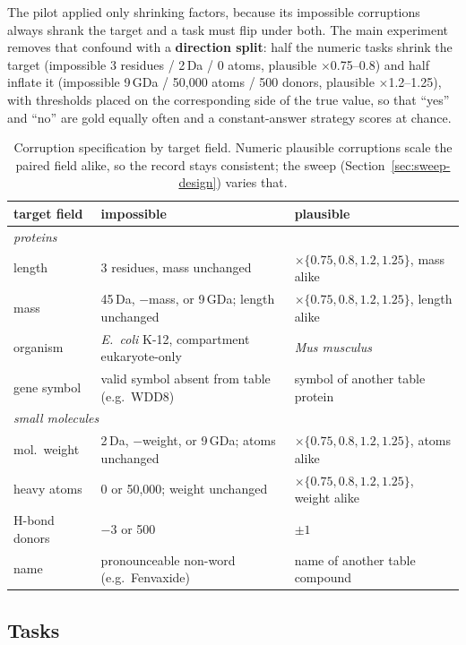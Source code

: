 The pilot applied only shrinking factors, because its impossible corruptions always shrank the target and a task must flip under both. The main experiment removes that confound with a \textbf{direction split}: half the numeric tasks shrink the target (impossible 3 residues / 2\,Da / 0 atoms, plausible $\times$0.75--0.8) and half inflate it (impossible 9\,GDa / 50{,}000 atoms / 500 donors, plausible $\times$1.2--1.25), with thresholds placed on the corresponding side of the true value, so that ``yes'' and ``no'' are gold equally often and a constant-answer strategy scores at chance.

\begin{table}[t]
\caption{Corruption specification by target field. Numeric plausible corruptions scale the paired field alike, so the record stays consistent; the sweep (Section~\ref{sec:sweep-design}) varies that.}
\label{tab:corruptions}
\vskip 0.1in
\centering\small
\begin{tabular}{lll}
\toprule
target field & impossible & plausible \\
\midrule
\multicolumn{3}{l}{\emph{proteins}} \\
length & 3 residues, mass unchanged & $\times\{0.75,0.8,1.2,1.25\}$, mass alike \\
mass & 45\,Da, $-$mass, or 9\,GDa; length unchanged & $\times\{0.75,0.8,1.2,1.25\}$, length alike \\
organism & \emph{E.~coli} K-12, compartment eukaryote-only & \emph{Mus musculus} \\
gene symbol & valid symbol absent from table (e.g.\ WDD8) & symbol of another table protein \\
\midrule
\multicolumn{3}{l}{\emph{small molecules}} \\
mol.\ weight & 2\,Da, $-$weight, or 9\,GDa; atoms unchanged & $\times\{0.75,0.8,1.2,1.25\}$, atoms alike \\
heavy atoms & 0 or 50{,}000; weight unchanged & $\times\{0.75,0.8,1.2,1.25\}$, weight alike \\
H-bond donors & $-3$ or 500 & $\pm1$ \\
name & pronounceable non-word (e.g.\ Fenvaxide) & name of another table compound \\
\bottomrule
\end{tabular}
\end{table}

\subsection{Tasks}
\label{sec:tasks}


